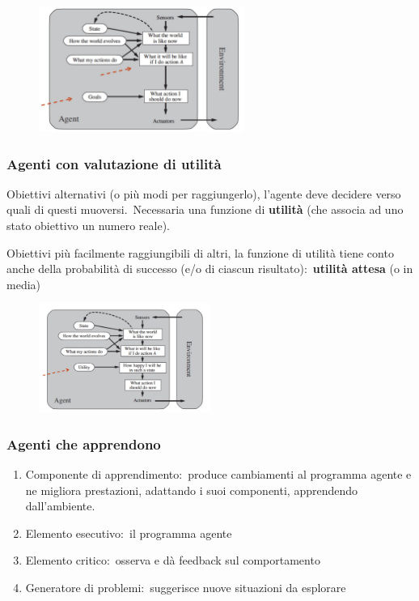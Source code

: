 \begin{figure}[H]
	\centering
	\includegraphics[width=0.6\textwidth]{immagini/Agente_obiettivo.jpg}
\end{figure}

\subsubsection{Agenti con valutazione di utilità}

Obiettivi alternativi (o più modi per raggiungerlo), l'agente deve decidere verso quali di questi muoversi.\
Necessaria una funzione di \textbf{utilità} (che associa ad uno stato obiettivo un numero reale).

Obiettivi più facilmente raggiungibili di altri, la funzione di utilità tiene conto anche della probabilità di successo (e/o di ciascun risultato):\ \textbf{utilità attesa} (o in media)

\begin{figure}[H]
	\centering
	\includegraphics[width=0.5\textwidth]{immagini/Agente_utility.jpg}
\end{figure}

\subsubsection{Agenti che apprendono}
\begin{enumerate}
	\item Componente di apprendimento:\ produce cambiamenti al programma agente e ne migliora prestazioni, adattando i suoi componenti, apprendendo dall'ambiente.
	\item Elemento esecutivo:\ il programma agente
	\item Elemento critico:\ osserva e dà feedback sul comportamento
	\item Generatore di problemi:\ suggerisce nuove situazioni da esplorare
\end{enumerate}

